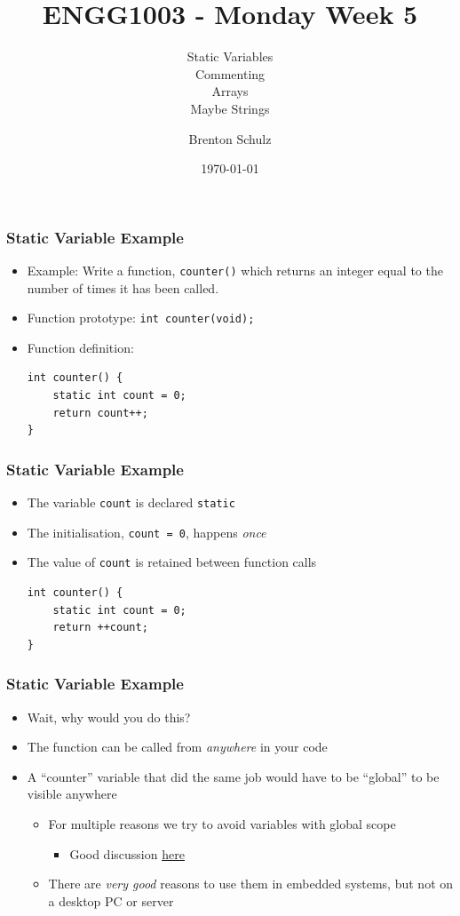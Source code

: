 \documentclass[14pt]{beamer}
\title{ENGG1003 - Monday Week 5}
\subtitle{Static Variables\\Commenting\\Arrays\\Maybe Strings}
\author{Brenton Schulz}
\institute{University of Newcastle}
\date{\today}
\begin{document}
\titlepage

\begin{frame}[fragile]
\frametitle{Static Variable Example}
\begin{itemize}
\item Example: Write a function, \texttt{counter()} which returns an integer equal to the number of times it has been called.
\pause
\item Function prototype: \texttt{int counter(void);}
\pause
\item Function definition:
\begin{lstlisting}[style=CStyle]
int counter() {
	static int count = 0;
	return count++;
}
\end{lstlisting}
\end{itemize}
\end{frame}

\begin{frame}[fragile]
\frametitle{Static Variable Example}
\begin{itemize}
\item The variable \texttt{count} is declared \texttt{static}
\item The initialisation, \texttt{count = 0}, happens \textit{once}
\item The value of \texttt{count} is retained between function calls 
\begin{lstlisting}[style=CStyle]
int counter() {
	static int count = 0;
	return ++count;
}
\end{lstlisting}
\end{itemize}
\end{frame}

\begin{frame}
\frametitle{Static Variable Example}
\begin{itemize}
\item Wait, why would you do this?
\pause
\item The function can be called from \textit{anywhere} in your code
\pause
\item A ``counter'' variable that did the same job would have to be ``global'' to be visible anywhere
	\begin{itemize}
\pause
		\item For multiple reasons we try to avoid variables with global scope
			\begin{itemize}
				\item Good discussion \underline{\href{http://wiki.c2.com/?GlobalVariablesAreBad}{here}}
			\end{itemize}
\pause
		\item There are \textit{very good} reasons to use them in embedded systems, but not on a desktop PC or server
	\end{itemize}
\end{itemize}
\end{frame}
\end{document}
